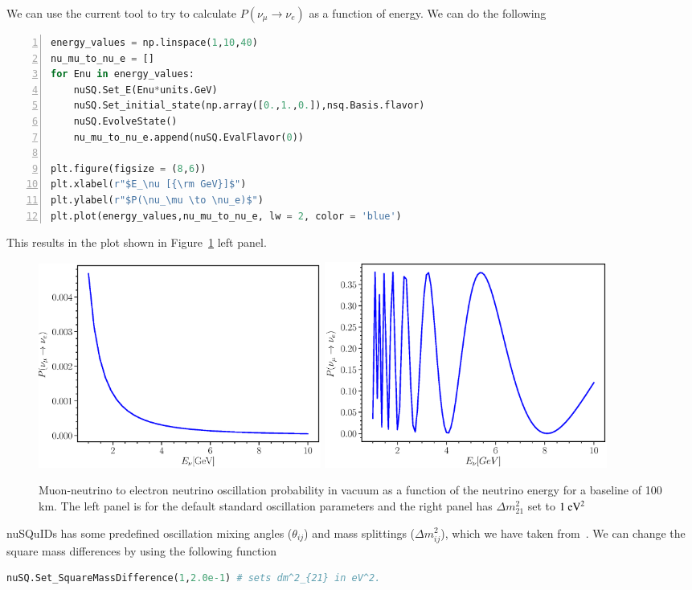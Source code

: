 \documentclass[3p,12pt]{elsarticle}
\begin{document}
We can use the current tool to try to calculate $P(\nu_\mu \to \nu_e)$ as a function of energy. We can do the following
\begin{lstlisting}[language=Python, frame=leftline, numbers=left, breaklines=true]
energy_values = np.linspace(1,10,40)
nu_mu_to_nu_e = []
for Enu in energy_values:
    nuSQ.Set_E(Enu*units.GeV)
    nuSQ.Set_initial_state(np.array([0.,1.,0.]),nsq.Basis.flavor)
    nuSQ.EvolveState()
    nu_mu_to_nu_e.append(nuSQ.EvalFlavor(0))

plt.figure(figsize = (8,6))
plt.xlabel(r"$E_\nu [{\rm GeV}]$")
plt.ylabel(r"$P(\nu_\mu \to \nu_e)$")
plt.plot(energy_values,nu_mu_to_nu_e, lw = 2, color = 'blue')
\end{lstlisting}
This results in the plot shown in Figure~\ref{fig:nusquids_python_osc} left panel.
\begin{figure}[h!]
  \label{fig:nusquids_python_osc}
  \centering
  \includegraphics[width=0.45\textwidth]{fig/nusquids_python_osc_std.eps}
  \includegraphics[width=0.45\textwidth]{fig/nusquids_python_osc_nonstd.eps}
  \caption{Muon-neutrino to electron neutrino oscillation probability in vacuum as a function of the neutrino energy for a baseline of 100 km. 
  The left panel is for the default standard oscillation parameters and the right panel has $\Delta m^2_{21}$ set to $1~{\rm eV}^2$}
\end{figure}

nuSQuIDs has some predefined oscillation mixing angles ($\theta_{ij}$) and mass splittings ($\Delta m^2_{ij}$),
which we have taken from~\cite{nufit}.
We can change the square mass differences by using the following function
\begin{lstlisting}[language=Python, breaklines=true]
nuSQ.Set_SquareMassDifference(1,2.0e-1) # sets dm^2_{21} in eV^2.
\end{lstlisting}
\end{document}
